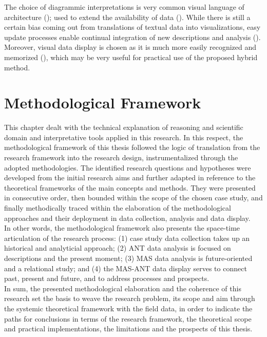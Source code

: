 \documentclass[11pt]{report}
\begin{document}
{{{{The choice of diagrammic interpretations is very common visual language of architecture (\href{Chaplin}{\citealt{chaplin_architecture_2015}}); used to extend the availability of data (\href{Hemmersam}{\citealt{hemmersam_exploring_2016}}).
While there is still a certain bias coming out from translations of textual data into visualizations, easy update processes enable continual integration of new descriptions and analysis (\href{Tufte}{\citealt{tufte_visual_2001}}). 
Moreover, visual data display is chosen as it is much more easily recognized and memorized (\href{Krum}{\citealt{krum_cool_2013}}), which may be very useful for practical use of the proposed hybrid method.

\section{Methodological Framework}

This chapter dealt with the technical explanation of reasoning and scientific domain and interpretative tools applied in this research. In this respect, the methodological framework of this thesis followed the logic of translation from the research framework into the research design, instrumentalized through the adopted methodologies. The identified research questions and hypotheses were developed from the initial research aims and further adapted in reference to the theoretical frameworks of the main concepts and methods. They were presented in consecutive order, then bounded within the scope of the chosen case study, and finally methodically traced within the elaboration of the methodological approaches and their deployment in data collection, analysis and data display.
\\

In other words, the methodological framework also presents the space-time articulation of the research process: (1) case study data collection takes up an historical and analyticial approach; (2) ANT data analysis is focused on descriptions and the present moment; (3) MAS data analysis is future-oriented and a relational study; and (4) the MAS-ANT data display serves to connect past, present and future, and to address processes and prospects.
\\

In sum, the presented methodological elaboration and the coherence of this research set the basis to weave the research problem, its scope and aim through the systemic theoretical framework with the field data, in order to indicate the paths for conclusions in terms of the research framework, the theoretical scope and practical implementations, the limitations and the prospects of this thesis.

}}}}
\end{document}
